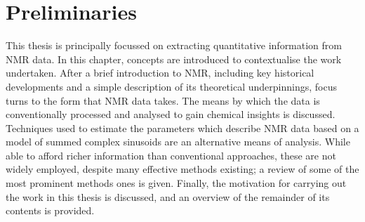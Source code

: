 \chapter{Preliminaries}
\label{chap:intro}

This thesis is principally focussed on extracting quantitative information
from \ac{NMR} data. In this chapter, concepts are introduced to
contextualise the work undertaken.
After a brief introduction to \ac{NMR}, including key historical developments
and a simple description of its theoretical underpinnings, focus turns to
the form that \ac{NMR} data takes. The means by which the data is
conventionally processed and analysed to gain chemical insights is discussed.
Techniques used to estimate the parameters which describe \ac{NMR} data based
on a model of summed complex sinusoids are an alternative means of analysis.
While able to afford richer information than conventional
approaches, these are not widely employed, despite many effective
methods existing; a review of some of the most prominent methods ones is
given. Finally, the motivation for carrying out the work in this thesis is
discussed, and an overview of the remainder of its contents is provided.




